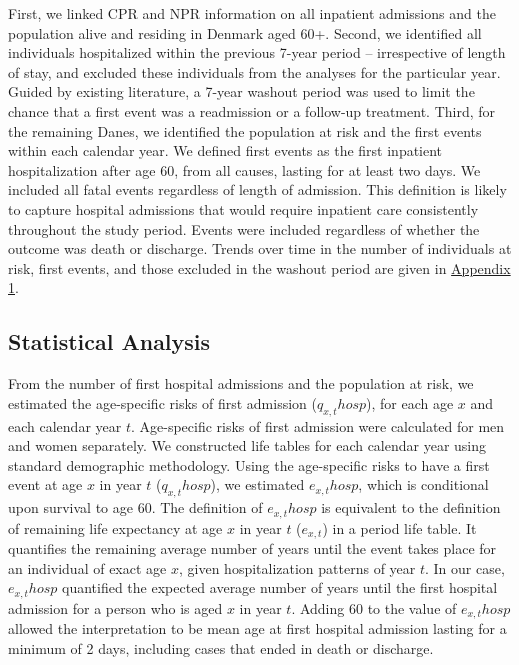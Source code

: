 First, we linked CPR and NPR information on all inpatient admissions and the 
population alive and residing in Denmark aged 60+. Second, we identified all 
individuals hospitalized within the previous 7-year period -- irrespective 
of length of stay, and excluded these individuals from the analyses for the 
particular year. Guided by existing literature,\citep{modig2017estimating,
roberts2015revisiting} a 7-year washout period was used to limit the chance 
that a first event was a readmission or a follow-up treatment. Third, for the 
remaining Danes, we identified the population at risk and the first events 
within each calendar year. We defined first events as the first inpatient 
hospitalization after age 60, from all causes, lasting for at least two days.
We included all fatal events regardless of length of admission. This definition 
is likely to capture hospital admissions that would require inpatient care 
consistently throughout the study period.  Events were included regardless 
of whether the outcome was death or discharge. Trends over time in the number 
of individuals at risk, first events, and those excluded in the washout period 
are given in \hyperref[ch4:app1]{Appendix 1}. \\

\subsection{Statistical Analysis}

From the number of first hospital admissions and the population at risk, we 
estimated the age-specific risks of first admission ($q_{x,t}hosp$), for each 
age $x$ and each calendar year $t$. Age-specific risks of first admission were 
calculated for men and women separately. We constructed life tables for each calendar 
year using standard demographic methodology.\citep{preston2000demography} 
Using the age-specific risks to have a first event at age $x$ in year $t$ ($q_{x,t}hosp$), 
we estimated $e_{x,t}hosp$, which is conditional upon survival to age 60. The 
definition of $e_{x,t}hosp$ is equivalent to the definition of remaining life 
expectancy at age $x$ in year $t$ ($e_{x,t}$) in a period life table. It quantifies 
the remaining average number of years until the event takes place for an 
individual of exact age $x$, given hospitalization patterns of year $t$.  In 
our case, $e_{x,t}hosp$ quantified the expected average number of years until 
the first hospital admission for a person who is aged $x$ in year $t$. Adding 
$60$ to the value of $e_{x,t}hosp$ allowed the interpretation to be mean age at 
first hospital admission lasting for a minimum of 2 days, including cases 
that ended in death or discharge.

